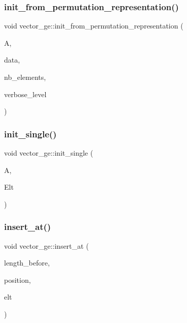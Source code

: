 \subsubsection{\texorpdfstring{init\+\_\+from\+\_\+permutation\+\_\+representation()}{init\_from\_permutation\_representation()}}
{\footnotesize\ttfamily void vector\+\_\+ge\+::init\+\_\+from\+\_\+permutation\+\_\+representation (\begin{DoxyParamCaption}\item[{\mbox{\hyperlink{classaction}{action}} $\ast$}]{A,  }\item[{\mbox{\hyperlink{galois_8h_a09fddde158a3a20bd2dcadb609de11dc}{I\+NT}} $\ast$}]{data,  }\item[{\mbox{\hyperlink{galois_8h_a09fddde158a3a20bd2dcadb609de11dc}{I\+NT}}}]{nb\+\_\+elements,  }\item[{\mbox{\hyperlink{galois_8h_a09fddde158a3a20bd2dcadb609de11dc}{I\+NT}}}]{verbose\+\_\+level }\end{DoxyParamCaption})}

\mbox{\label{classvector__ge_adcce2d6c43d1769de8ce74c85a5041aa}} 
\subsubsection{\texorpdfstring{init\+\_\+single()}{init\_single()}}
{\footnotesize\ttfamily void vector\+\_\+ge\+::init\+\_\+single (\begin{DoxyParamCaption}\item[{\mbox{\hyperlink{classaction}{action}} $\ast$}]{A,  }\item[{\mbox{\hyperlink{galois_8h_a09fddde158a3a20bd2dcadb609de11dc}{I\+NT}} $\ast$}]{Elt }\end{DoxyParamCaption})}

\mbox{\label{classvector__ge_afc62cf3c920b922450d27cbf4dae5af0}} 
\subsubsection{\texorpdfstring{insert\+\_\+at()}{insert\_at()}}
{\footnotesize\ttfamily void vector\+\_\+ge\+::insert\+\_\+at (\begin{DoxyParamCaption}\item[{\mbox{\hyperlink{galois_8h_a09fddde158a3a20bd2dcadb609de11dc}{I\+NT}}}]{length\+\_\+before,  }\item[{\mbox{\hyperlink{galois_8h_a09fddde158a3a20bd2dcadb609de11dc}{I\+NT}}}]{position,  }\item[{\mbox{\hyperlink{galois_8h_a09fddde158a3a20bd2dcadb609de11dc}{I\+NT}} $\ast$}]{elt }\end{DoxyParamCaption})}

